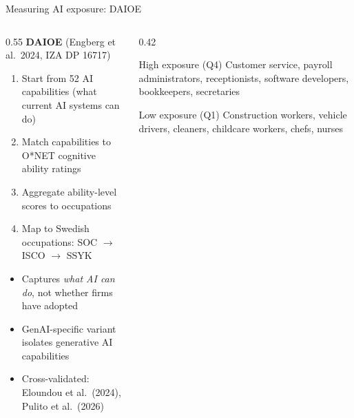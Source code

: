 \documentclass[aspectratio=169,11pt]{beamer}
\begin{document}
\begin{frame}{Measuring AI exposure: DAIOE}
\begin{columns}[T]
\begin{column}{0.55\textwidth}
\textbf{DAIOE} (Engberg et al.\ 2024, IZA DP 16717)
\begin{enumerate}
    \item Start from 52 AI capabilities (what current AI systems can do)
    \item Match capabilities to O*NET cognitive ability ratings
    \item Aggregate ability-level scores to occupations
    \item Map to Swedish occupations: SOC $\to$ ISCO $\to$ SSYK
\end{enumerate}
\vspace{2mm}
\begin{itemize}
    \item Captures \textit{what AI can do}, not whether firms have adopted
    \item GenAI-specific variant isolates generative AI capabilities
    \item Cross-validated: Eloundou et al.\ (2024), Pulito et al.\ (2026)
\end{itemize}
\end{column}
\begin{column}{0.42\textwidth}
\begin{block}{High exposure (Q4)}
\footnotesize
Customer service, payroll administrators, receptionists, software developers, bookkeepers, secretaries
\end{block}
\vspace{2mm}
\begin{block}{Low exposure (Q1)}
\footnotesize
Construction workers, vehicle drivers, cleaners, childcare workers, chefs, nurses
\end{block}
\end{column}
\end{columns}
\hypertarget{main:daioe}{}
\end{frame}
\end{document}
